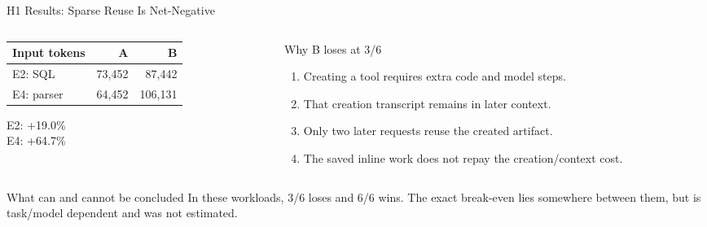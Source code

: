 \documentclass[aspectratio=169,11pt]{beamer}
\begin{document}
\begin{frame}{H1 Results: Sparse Reuse Is Net-Negative}
  \footnotesize
  \begin{columns}[T,totalwidth=\textwidth]
    \begin{column}{0.43\textwidth}
      \centering
      \renewcommand{\arraystretch}{1.25}
      \begin{tabular}{lrr}
        \toprule
        \textbf{Input tokens} & \textbf{A} & \textbf{B} \\
        \midrule
        E2: SQL & 73{,}452 & 87{,}442 \\
        E4: parser & 64{,}452 & 106{,}131 \\
        \bottomrule
      \end{tabular}
      \vspace{0.3cm}

      E2: \alert{+19.0\%}\\
      E4: \alert{+64.7\%}
    \end{column}
    \begin{column}{0.53\textwidth}
      \begin{alertblock}{Why B loses at 3/6}
        \begin{enumerate}
          \item Creating a tool requires extra code and model steps.
          \item That creation transcript remains in later context.
          \item Only two later requests reuse the created artifact.
          \item The saved inline work does not repay the creation/context cost.
        \end{enumerate}
      \end{alertblock}
    \end{column}
  \end{columns}
  \vspace{0.2cm}
  \begin{block}{What can and cannot be concluded}
    In these workloads, 3/6 loses and 6/6 wins. The exact break-even lies
    somewhere between them, but is task/model dependent and was not estimated.
  \end{block}
\end{frame}
\end{document}
